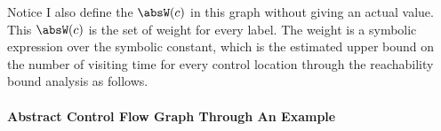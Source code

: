 Notice I also define the $\absW(c)$ in this graph without giving an actual value.
This $\absW(c)$ is the set of weight for every 
label. The weight is a symbolic expression over the symbolic constant, 
which is the estimated upper bound on the number of visiting time for every control location
through the reachability bound analysis as follows.
%
%
\paragraph*{Abstract Control Flow Graph Through An Example}
%

%




